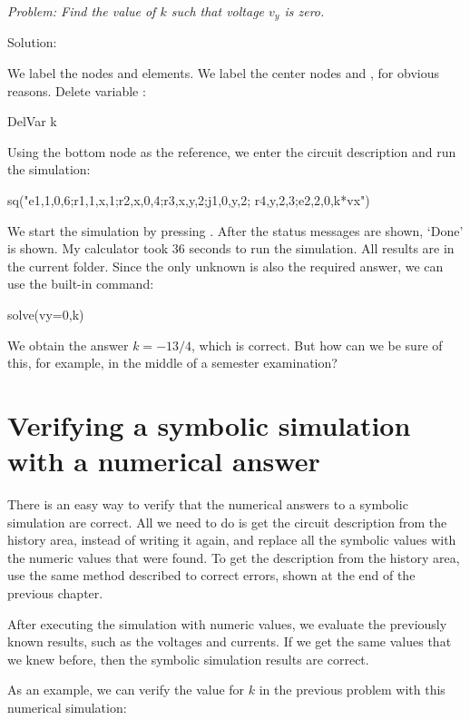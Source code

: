 
\emph{Problem: Find the value of $k$ such that voltage $v_y$ is
zero.}

Solution:

We label the nodes and elements. We label the center nodes 
and , for obvious reasons. Delete variable :

\begin{entry}
DelVar k
\end{entry}

Using the bottom node as the reference, we enter the circuit
description and run the simulation:

\begin{entry}
sq\dc("e1,1,0,6;r1,1,x,1;r2,x,0,4;r3,x,y,2;j1,0,y,2;
      r4,y,2,3;e2,2,0,k*vx")
\end{entry}

We start the simulation by pressing . After the status
messages are shown, `Done' is shown. My calculator took 36 seconds
to run the simulation. All results are in the current folder. Since
the only unknown is also the required answer, we can use the
built-in  command:

\begin{entry}
solve(vy=0,k)
\end{entry}

We obtain the answer $k = -13/4$, which is correct. But how can we
be sure of this, for example, in the middle of a semester
examination?

\section{Verifying a symbolic simulation with a numerical answer}

There is an easy way to verify that the numerical answers to a
symbolic simulation are correct. All we need to do is get the
circuit description from the history area, instead of writing it
again, and replace all the symbolic values with the numeric values
that were found. To get the description from the history area, use
the same method described to correct errors, shown at the end of the
previous chapter.

After executing the simulation with numeric values, we evaluate the
previously known results, such as the voltages and currents. If we
get the same values that we knew before, then the symbolic
simulation results are correct.

As an example, we can verify the value for $k$ in the previous
problem with this numerical simulation:

